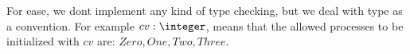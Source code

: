 For ease, we dont implement any kind of type checking, but we deal with type as a convention. For example $cv: \integer$, means that the allowed processes to be initialized with $cv$ are: $Zero, One, Two, Three$.
